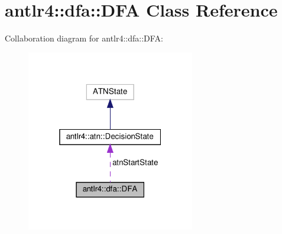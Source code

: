 \hypertarget{classantlr4_1_1dfa_1_1DFA}{}\section{antlr4\+:\+:dfa\+:\+:D\+FA Class Reference}
\label{classantlr4_1_1dfa_1_1DFA}


Collaboration diagram for antlr4\+:\+:dfa\+:\+:D\+FA\+:
\nopagebreak
\begin{figure}[H]
\begin{center}
\leavevmode
\includegraphics[width=208pt]{classantlr4_1_1dfa_1_1DFA__coll__graph}
\end{center}
\end{figure}
